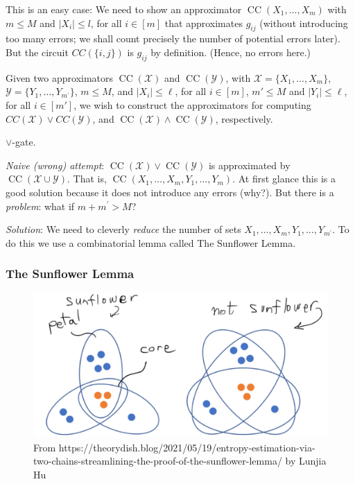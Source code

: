 This is an easy case: We need to show an approximator $\operatorname{CC}(X_1, \ldots, X_m)$ with $m \leq M$ and $\left|X_i\right| \leqslant l$, for all $i \in[m]$ that approximates $g_{i j}$ (without introducing too many errors; we shall count precisely the number of potential errors later).
But the circuit $C C(\{i, j\})$ is $g_{i j}$ by definition. (Hence, no errors here.)





Given two approximators
$\operatorname{CC}(\mathcal X)$ and 
$\operatorname{CC}(\mathcal Y) 
$, with $\mathcal{X}=\{X_1, \ldots, X_m\}$, 
$\mathcal{Y}=\{Y_1, \ldots, Y_{m^{\prime}}\}$, $m\le M$, and $\left|X_i\right| \leq \ell $, for all $i\in[m]$, $m'\le M $ and $\left|Y_i\right| \leq \ell$, for all $i\in[m']$, we wish to construct the  approximators  for computing $CC(\mathcal{X}) \vee CC(\mathcal{Y})$, and $\operatorname{CC}(\mathcal X) \wedge 
\operatorname{CC}(\mathcal Y)$, respectively.

$\lor$-gate.

\textit{Naive (wrong) attempt}: $\operatorname{CC}(\mathcal X)
\lor \operatorname{CC}(\mathcal Y)$ is approximated by $\operatorname{CC}(\mathcal X \cup \mathcal Y)$. That is, $\operatorname{CC}\left(X_1, \ldots, X_m, Y_1, \ldots, Y_m\right)$. At first glance this is a good solution because it does not introduce any errors (why?). But there is a \textit{problem}: what if $m+m^{\prime}>M$?


\textit{Solution}: We need to cleverly \emph{reduce} the number of sets $X_1, \ldots, X_m, Y_1, \ldots, Y_{m^{\prime}}$. To do this we use a combinatorial lemma called The Sunflower Lemma.

\subsubsection{The Sunflower Lemma}

\begin{figure}
    \centering
        \includegraphics[width=0.75\linewidth]{images/sunflower-lemma.png}
    \caption{From https://theorydish.blog/2021/05/19/entropy-estimation-via-two-chains-streamlining-the-proof-of-the-sunflower-lemma/ by Lunjia Hu}
    \label{fig:enter-label}
\end{figure}



